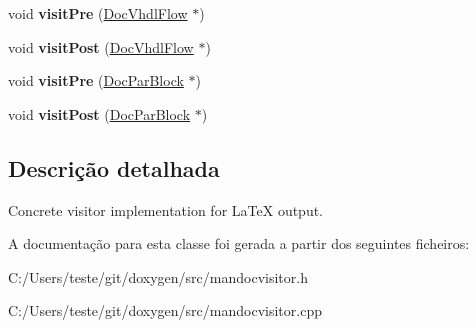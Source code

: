 \begin{DoxyCompactItemize}
\item 
\hypertarget{class_man_doc_visitor_ab7c53055027c60e0a3a9f4f93e9c3d85}{void {\bfseries visit\-Pre} (\hyperlink{class_doc_vhdl_flow}{Doc\-Vhdl\-Flow} $\ast$)}\label{class_man_doc_visitor_ab7c53055027c60e0a3a9f4f93e9c3d85}

\item 
\hypertarget{class_man_doc_visitor_a79febe42f6e032c27aad9a418f979eca}{void {\bfseries visit\-Post} (\hyperlink{class_doc_vhdl_flow}{Doc\-Vhdl\-Flow} $\ast$)}\label{class_man_doc_visitor_a79febe42f6e032c27aad9a418f979eca}

\item 
\hypertarget{class_man_doc_visitor_acc4035c695184dd01a26145a88c1a588}{void {\bfseries visit\-Pre} (\hyperlink{class_doc_par_block}{Doc\-Par\-Block} $\ast$)}\label{class_man_doc_visitor_acc4035c695184dd01a26145a88c1a588}

\item 
\hypertarget{class_man_doc_visitor_a4bd3a84f45e2f6dc6420638ee8e4ee27}{void {\bfseries visit\-Post} (\hyperlink{class_doc_par_block}{Doc\-Par\-Block} $\ast$)}\label{class_man_doc_visitor_a4bd3a84f45e2f6dc6420638ee8e4ee27}

\end{DoxyCompactItemize}


\subsection{Descrição detalhada}
Concrete visitor implementation for La\-Te\-X output. 

A documentação para esta classe foi gerada a partir dos seguintes ficheiros\-:\begin{DoxyCompactItemize}
\item 
C\-:/\-Users/teste/git/doxygen/src/mandocvisitor.\-h\item 
C\-:/\-Users/teste/git/doxygen/src/mandocvisitor.\-cpp\end{DoxyCompactItemize}
